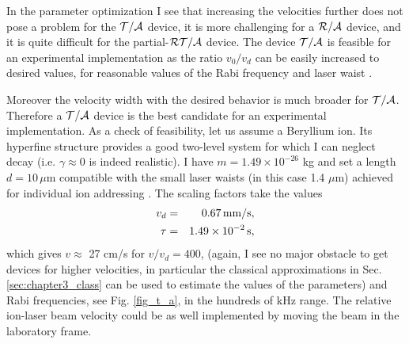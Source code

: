 In the parameter optimization I see that increasing the velocities further does not pose a problem for the ${\cal T/A}$
device, it is more challenging for a ${\cal R/A}$ device, and it is quite difficult for the partial-${\cal RT/A}$ device.  The device ${\cal T/A}$ is feasible for an experimental implementation  as the ratio $v_0/v_d$ can be easily increased to desired values, for  reasonable values of the
Rabi frequency and laser waist \cite{Zeyen2016}.

Moreover the velocity width with the desired behavior is much broader for ${\cal T/A}$. Therefore a ${\cal T/A}$
device is the best candidate for
an experimental implementation.
As a check of feasibility, let us assume a Beryllium ion. Its hyperfine structure provides a good  two-level system
for which I can neglect decay (i.e. $\gamma\approx 0$ is indeed realistic). I have $m=1.49\times 10^{-26}$ kg
and set a length $d=10\, \mu$m compatible with the small laser waists (in this case 1.4 $\mu$m) achieved for individual ion
addressing \cite{Zeyen2016}. The scaling factors take the values
%
\begin{eqnarray}
  v_d&=&0.67\, {\rm mm/s},
  \nonumber\\
  \tau&=&1.49\times 10^{-2}\, {\rm s},
  \nonumber
\end{eqnarray}
%
which gives  $v\approx$ 27 cm/s for $v/v_d=400$, (again, I see no major obstacle to get devices for higher velocities,
in particular the classical approximations in Sec. \ref{sec:chapter3_class} can be used to  estimate the values of the parameters)
and Rabi frequencies, see Fig. \ref{fig_t_a},  in the hundreds of kHz range. The relative ion-laser beam velocity could be as well
implemented  by moving the beam in the laboratory frame.

%
%
